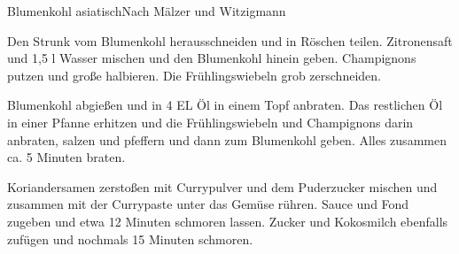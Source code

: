 \begin{recipe}{Blumenkohl asiatisch}{Nach Mälzer und Witzigmann}
  \inglist

  \steps

  Den Strunk vom Blumenkohl herausschneiden und in Röschen teilen. Zitronensaft
  und 1,5 l Wasser mischen und den Blumenkohl hinein geben. Champignons putzen
  und große halbieren. Die Frühlingswiebeln grob zerschneiden.

  Blumenkohl abgießen und in 4 EL Öl in einem Topf anbraten. Das restlichen Öl
  in einer Pfanne erhitzen und die Frühlingswiebeln und Champignons darin
  anbraten, salzen und pfeffern und dann zum Blumenkohl geben. Alles zusammen
  ca. 5 Minuten braten.

  Koriandersamen zerstoßen mit Currypulver und dem Puderzucker mischen und
  zusammen mit der Currypaste unter das Gemüse rühren. Sauce und Fond zugeben
  und etwa 12 Minuten schmoren lassen. Zucker und Kokosmilch ebenfalls zufügen
  und nochmals 15 Minuten schmoren.
\end{recipe}
